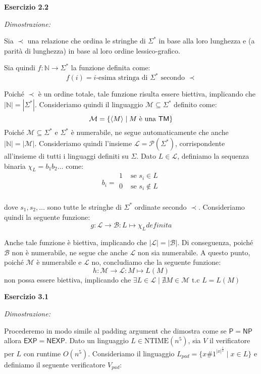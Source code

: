 \documentclass[12pt,a4paper]{report}
\theoremstyle{definition}
\newcommand{\abs}[1]{\left|#1\right|}
\newcommand{\abk}[1]{\left\langle#1\right\rangle}
\newcommand{\N}{\mathbb{N}}
\newcommand{\func}[3]{#1 : #2 \to #3}
\newcommand{\funcmap}[5]{#1 : #2 \to #3 : #4 \mapsto #5}
\begin{document}
        \textbf{Esercizio 2.2}

        \textit{Dimostrazione:}

        Sia $\prec$ una relazione che ordina le stringhe di $\Sigma^*$ in base alla loro lunghezza e (a parità di lunghezza) in base al loro ordine lessico-grafico.
        
        Sia quindi $\func{f}{\N}{\Sigma^*}$ la funzione definita come:
        \[f(i) = \text{$i$-esima stringa di $\Sigma^*$ secondo $\prec$}\]
        
        Poiché $\prec$ è un ordine totale, tale funzione risulta essere biettiva, implicando che $\abs{\N} = \abs{\Sigma^*}$. Consideriamo quindi il linguaggio $\mathcal{M} \subseteq \Sigma^*$ definito come:
        \[\mathcal{M} = \{\abk{M} \mid M \text{ è una \textsf{TM}}\}\]
        Poiché $\mathcal{M} \subseteq \Sigma^*$ e $\Sigma^*$ è numerabile, ne segue automaticamente che anche $\abs{\N} = \abs{\mathcal{M}}$. Consideriamo quindi l'insieme $\mathcal{L} = \mathcal{P}(\Sigma^*)$, corrispondente all'insieme di tutti i linguaggi definiti su $\Sigma$. Dato $L \in \mathcal{L}$, definiamo la sequenza binaria $\chi_L = b_1b_2\ldots$ come:
        \[b_i = \begin{array}{ll}
            1 & \text{ se } s_i \in L\\
            0 & \text{ se } s_i \notin L\\
        \end{array}\]

        dove $s_1, s_2, \ldots$ sono tutte le stringhe di $\Sigma^*$ ordinate secondo $\prec$. Consideriamo quindi la seguente funzione:
        \[\funcmap{g}{\mathcal{L}}{\mathcal{B}}{L}{\chi_Ldefinita}\]

        Anche tale funzione è biettiva, implicando che $\abs{\mathcal{L}} = \abs{\mathcal{B}}$. Di conseguenza, poiché $\mathcal{B}$ non è numerabile, ne segue che anche $\mathcal{L}$ non sia numerabile. A questo punto, poiché $\mathcal{M}$ è numerabile e $\mathcal{L}$ no, concludiamo che la seguente funzione:
        \[\funcmap{h}{\mathcal{M}}{\mathcal{L}}{M}{L(M)}\]
        non possa essere biettiva, implicando che $\exists L \in \mathcal{L} \mid \nexists M \in \mathcal{M} \text{ t.c } L = L(M)$


        \newpage

        \textbf{Esercizio 3.1}

        \textit{Dimostrazione:}

        Procederemo in modo simile al padding argument che dimostra come se $\mathsf{P} = \mathsf{NP}$ allora $\mathsf{EXP} = \mathsf{NEXP}$. Dato un linguaggio $L \in \mathrm{NTIME}(n^5)$, sia $V$ il verificatore per $L$ con runtime $O(n^5)$. Consideriamo il linguaggio $L_{pad} = \{x\#1^{{\abs{x}}^{\frac{5}{2}}} \mid x \in L\}$ e definiamo il seguente verificatore $V_{pad}$:
        
\end{document}

